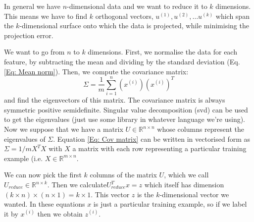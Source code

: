 \documentclass[a4paper, 10pt,hidelinks]{article}
\newcommand{\ind}[1]{^{(#1)}}
\begin{document}

In general we have $n$-dimensional data and we want to reduce it to $k$ dimensions. This means we have to find $k$ orthogonal vectors, $u\ind{1}, u\ind{2}, \ldots u\ind{k}$ which span the $k$-dimensional surface onto which the data is projected, while minimising the projection error.

We want to go from $n$ to $k$ dimensions.
First, we normalise the data for each feature, by subtracting the mean and dividing by the standard deviation (Eq. \eqref{Eq: Mean norm}).  Then, we compute the covariance matrix:
\begin{equation}\label{Eq: Cov matrix}
\Sigma = \frac{1}{m} \sum_{i = 1}^n \left(x\ind{i}\right) \left(x\ind{i}\right)^T
\end{equation}
and find the eigenvectors of this matrix. The covariance matrix is always symmetric positive semidefinite. Singular value decomposition (svd) can be used to get the eigenvalues (just use some library in whatever language we're using). Now we suppose that we have a matrix $U \in \mathbb{R}^{n \times n}$ whose columns represent the eigenvalues of $\Sigma$. Equation \eqref{Eq: Cov matrix} can be written in vectorised form as $\Sigma = 1/m X^T X$ with $X$ a matrix with each row representing a particular training example (i.e. $X \in \mathbb{R}^{m \times n}$. 

We can now pick the first $k$ columns of the matrix $U$, which we call $U_{reduce} \in \mathbb{R}^{n \times k}$. Then we calculate$U_{reduce}^T x = z$ which itself has dimension $(k \times n)\times (n \times 1) = k \times 1$. This vector $z$ is the $k$-dimensional vector we wanted. In these equations $x$ is just a particular training example, so if we label it by $x\ind{i}$ then we obtain $z\ind{i}$. 
\end{document}
